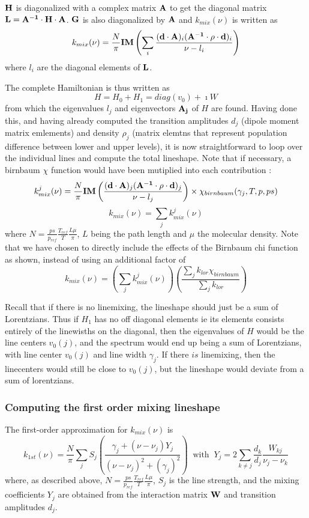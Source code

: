 \documentclass[11pt]{article}
\begin{document}
${\bf H}$ is diagonalized with a complex matrix ${\bf A}$ to get the 
diagonal matrix ${\bf L}={\bf A^{-1}}\cdot{\bf H}\cdot{\bf A}$.
${\bf G}$ is also diagonalized by ${\bf A}$ and $k_{mix}(\nu)$ is written
as
\[
k_{mix}(\nu)=\frac{N}{\pi} {\bf IM} \left(\sum_{i}\frac{({\bf d
\cdot
    A})_{i} ({\bf A^{-1}\cdot\rho\cdot d})_{i}}{\nu - l_{i}}\right)
\]
where $l_{i}$ are the diagonal elements of ${\bf L}$.  

The complete Hamiltonian is thus written as
\[
H = H_{0} + H_{1} = diag(v_{0}) + \imath W
\]
from which the eigenvalues ${l_{j}}$ and eigenvectors ${\bf A_{j}}$ of $H$ 
are found. Having done this, and having already computed the transition
amplitudes $d_{j}$ (dipole moment matrix emlements) and density $\rho_{j}$
(matrix elemtns that represent population difference between lower and 
upper levels), it is now straightforward to loop over the individual lines
and compute the total lineshape. Note that if necessary, a birnbaum $\chi$
function would have been mutiplied into each contribution : 
\[
k_{mix}^{j}(\nu)=\frac{N}{\pi} {\bf IM} \left( \frac{({\bf d
\cdot
    A})_{j} ({\bf A^{-1}\cdot\rho\cdot d})_{j}}{\nu - l_{j}}\right)
    \times \chi_{birnbaum}(\gamma_{j},T,p,ps)
\]
\[
k_{mix}(\nu) = \sum_{j} k_{mix}^{j}(\nu)
\]
where $N = \frac{ps}{p_{ref}} \frac{T_{ref}}{T} \frac{L\mu}{\pi}$, $L$ 
being the path length and $\mu$ the molecular density. Note that we have 
chosen to directly include the effects of the Birnbaum chi function as 
shown, instead of using an additional factor of
\[
k_{mix}(\nu) = \left( \sum_{j} k_{mix}^{j}(\nu) \right)
               \left( \frac{\sum_{j} k_{lor} \chi_{birnbaum}}
                           {\sum_{j} k_{lor}} \right)
\]

Recall that if there is no linemixing, the lineshape should just be a sum
of Lorentzians. Thus if $H_{1}$ has no off diagonal elements ie its elements
consists entirely of the linewisths on the diagonal, then the eigenvalues of
$H$ would be the line centers $v_{0}(j)$, and the spectrum would end up 
being a sum of Lorentzians, with line center $v_{0}(j)$ and line width
$\gamma_{j}$. If there $is$ linemixing, then the linecenters would still
be close to $v_{0}(j)$, but the lineshape would deviate from a sum of 
lorentzians.

\subsubsection{Computing the first order mixing lineshape}
The first-order approximation for $k_{mix}(\nu)$ is
\[
k_{1st}(\nu)=\frac{N}{\pi}\sum_{j} S_{j}
\left(\frac{ \gamma_{j}+ 
(\nu-\nu_{j})Y_{j}}{(\nu-\nu_{j})^{2}+(\gamma_{j})^{2}}\right)
\; \; \mbox{with} \; \; 
Y_j=2\sum_{k\neq j}\frac{d_k}{d_j}\frac{W_{kj}}{\nu_j-\nu_k}
\]
where, as described above, $N = \frac{ps}{p_{ref}} \frac{T_{ref}}{T} 
\frac{L\mu}{\pi}$, $S_{j}$ is the line strength, and the mixing coefficients
$Y_{j}$ are obtained from the interaction matrix ${\bf W}$ and transition
amplitudes $d_{j}$.
\end{document}
